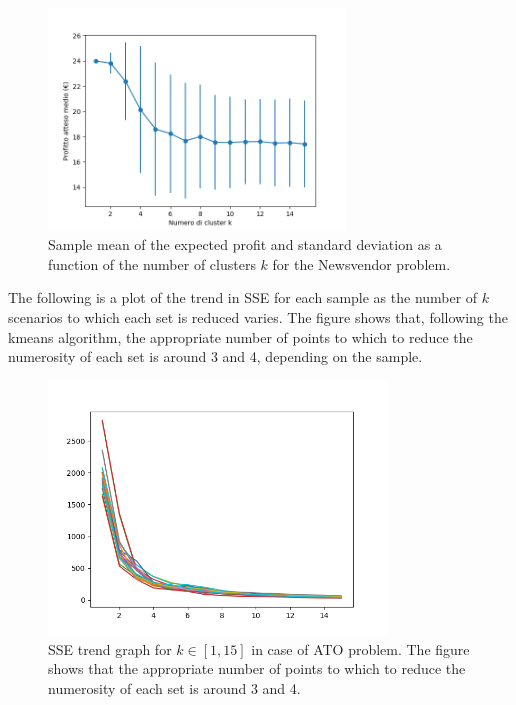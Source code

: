 \documentclass[a4paper,12pt]{article}
\begin{document}
	\begin{figure}[H]
		\centering
		\includegraphics[width=0.7\textwidth]{../immagini/rendimentoK_ato.png}
		\caption{Sample mean of the expected profit and standard deviation as a function of the number of clusters $k$ for the Newsvendor problem.}
		\label{fig:rendimentoK-ato}
	\end{figure}
	
	\noindent The following is a plot of the trend in SSE for each sample as the number of $k$ scenarios to which each set is reduced varies. The figure shows that, following the kmeans algorithm, the appropriate number of points to which to reduce the numerosity of each set is around 3 and 4, depending on the sample.
	
	
	\begin{figure}[H]
		\centering
		\includegraphics[width=0.8\textwidth]{../immagini/sseATO.png}
		\caption{SSE trend graph for $k \in [1,15]$ in case of ATO problem. The figure shows that the appropriate number of points to which to reduce the numerosity of each set is around 3 and 4.}
		\label{fig:sse-ato}
	\end{figure}
	
\end{document}
